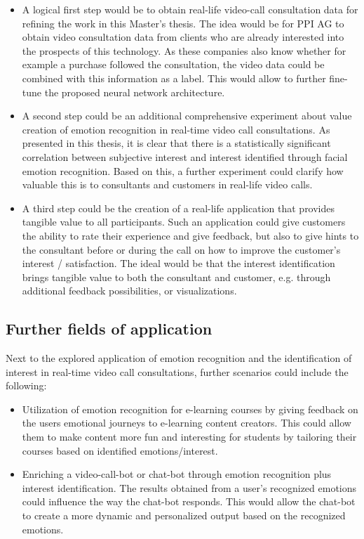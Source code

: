 \begin{itemize}
    \item A logical first step would be to obtain real-life video-call consultation data for refining the work in this Master's thesis. The idea would be for PPI AG to obtain video consultation data from clients who are already interested into the prospects of this technology. As these companies also know whether for example a purchase followed the consultation, the video data could be combined with this information as a label. This would allow to further fine-tune the proposed neural network architecture.
    \item A second step could be an additional comprehensive experiment about value creation of emotion recognition in real-time video call consultations. As presented in this thesis, it is clear that there is a statistically significant correlation between subjective interest and interest identified through facial emotion recognition. Based on this, a further experiment could clarify how valuable this is to consultants and customers in real-life video calls.
    \item A third step could be the creation of a real-life application that provides tangible value to all participants. Such an application could give customers the ability to rate their experience and give feedback, but also to give hints to the consultant before or during the call on how to improve the customer's interest / satisfaction. The ideal would be that the interest identification brings tangible value to both the consultant and customer, e.g. through additional feedback possibilities, or visualizations.
\end{itemize}

\subsection{Further fields of application}
Next to the explored application of emotion recognition and the identification of interest in real-time video call consultations, further scenarios could include the following:\newline
\begin{itemize}
    \item Utilization of emotion recognition for e-learning courses by giving feedback on the users emotional journeys to e-learning content creators. This could allow them to make content more fun and interesting for students by tailoring their courses based on identified emotions/interest.
    \item Enriching a video-call-bot or chat-bot through emotion recognition plus interest identification. The results obtained from a user's recognized emotions could influence the way the chat-bot responds. This would allow the chat-bot to create a more dynamic and personalized output based on the recognized emotions.
\end{itemize}



